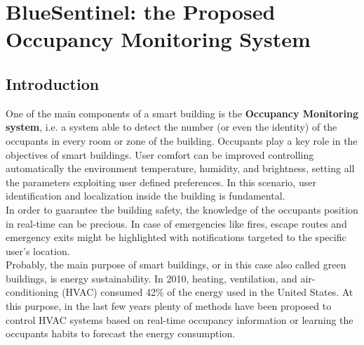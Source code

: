 %
%
\chapter[BlueSentinel: the Occupancy Monitoring System]{BlueSentinel: the Proposed Occupancy Monitoring System}
%
\label{cap:bluesentinel}

\section{Introduction}
\label{sec:intro}


One of the main components of a smart building is the \textbf{Occupancy Monitoring system}, i.e. a system able to detect the number (or even the identity) of the occupants in every room or zone of the building. Occupants play a key role in the objectives of smart buildings. User comfort can be improved controlling automatically the environment temperature, humidity, and brightness, setting all the parameters exploiting user defined preferences. In this scenario, user identification and localization inside the building is fundamental.\\
In order to guarantee the building safety, the knowledge of the occupants position in real-time can be precious. In case of emergencies like fires, escape routes and emergency exits might be highlighted with notifications targeted to the specific user's location.\\
Probably, the main purpose of smart buildings, or in this case also called green buildings, is energy sustainability.
In 2010, heating, ventilation, and air-conditioning (HVAC) consumed 42\% of the energy used in the United States.
At this purpose, in the last few years plenty of methods have been proposed to control HVAC systems based on real-time occupancy information or learning the occupants habits to forecast the energy consumption.

